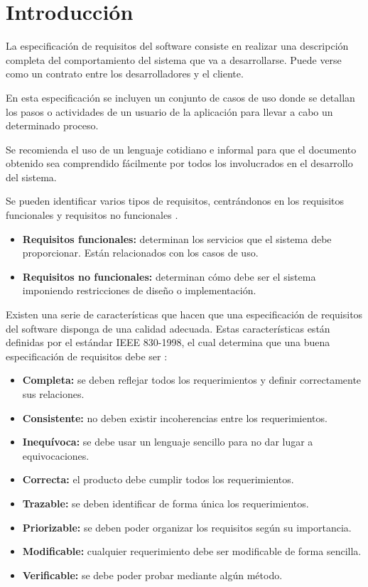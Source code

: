 
\section{Introducción}

La especificación de requisitos del software consiste en realizar una descripción completa del comportamiento del sistema que va a desarrollarse. Puede verse como un contrato entre los desarrolladores y el cliente.

En esta especificación se incluyen un conjunto de casos de uso donde se detallan los pasos o actividades de un usuario de la aplicación para llevar a cabo un determinado proceso.

Se recomienda el uso de un lenguaje cotidiano e informal para que el documento obtenido sea comprendido fácilmente por todos los involucrados en el desarrollo del sistema.

Se pueden identificar varios tipos de requisitos, centrándonos en los requisitos funcionales y requisitos no funcionales \cite{wiki:ers}.

\begin{itemize}
\tightlist
\item
  \textbf{Requisitos funcionales:} determinan los servicios que el sistema debe proporcionar. Están relacionados con los casos de uso.
\item
  \textbf{Requisitos no funcionales:}  determinan cómo debe ser el sistema imponiendo restricciones de diseño o implementación.
\end{itemize}

Existen una serie de características que hacen que una especificación de requisitos del software disponga de una calidad adecuada. Estas características están definidas por el estándar IEEE 830-1998, el cual determina que una buena especificación de requisitos debe ser \cite{wiki:ers}:

\begin{itemize}
\tightlist
\item
  \textbf{Completa:} se deben reflejar todos los requerimientos y definir correctamente sus relaciones.
\item
  \textbf{Consistente:} no deben existir incoherencias entre los requerimientos.
\item
  \textbf{Inequívoca:} se debe usar un lenguaje sencillo para no dar lugar a equivocaciones.
\item
  \textbf{Correcta:} el producto debe cumplir todos los requerimientos.
\item
  \textbf{Trazable:} se deben identificar de forma única los requerimientos.
\item
  \textbf{Priorizable:}  se deben poder organizar los requisitos según su importancia.
\item
  \textbf{Modificable:} cualquier requerimiento debe ser modificable de forma sencilla.
\item
  \textbf{Verificable:} se debe poder probar mediante algún método.
\end{itemize}


